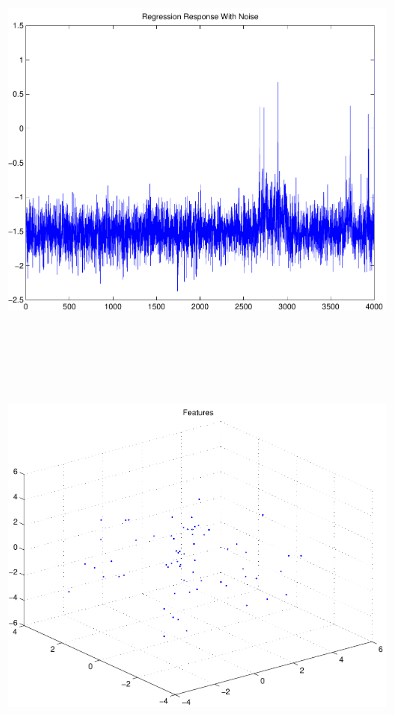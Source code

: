 \documentclass[9pt]{article}
\theoremstyle{plain}
\theoremstyle{definition}
\theoremstyle{remark}
\numberwithin{equation}{section}
\begin{document}
\includegraphics[width=10.0cm,height=10.0cm]{AtanDataSet_regression_response_with_noise.pdf}

\includegraphics[width=10.0cm,height=10.0cm]{regression_features.pdf}
\end{document}
